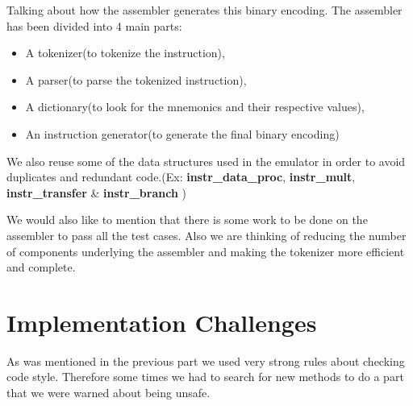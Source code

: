\documentclass[11pt]{article}
\begin{document}
Talking about how the assembler generates this binary encoding. The assembler
has been divided into 4 main parts:
\begin{itemize}
\item A tokenizer(to tokenize the instruction),
\item A parser(to parse the tokenized instruction),
\item A dictionary(to look for the mnemonics and their respective values),
\item An instruction generator(to generate the final binary encoding)
\end{itemize}

We also reuse some of the data structures used in the emulator in order to
avoid duplicates and redundant code.(Ex:
\textbf{instr\_data\_proc}, \textbf{instr\_mult}, \textbf{instr\_transfer} \& \textbf{instr\_branch}
)

We would also like to mention that there is some work to be done on the
assembler to pass all the test cases. Also we are thinking of reducing the
number of components underlying the assembler and making the tokenizer more
efficient and complete.

\section{Implementation Challenges}

As was mentioned in the previous part we used very strong rules about checking
code style. Therefore some times we had to search for new methods to do a part
that we were warned about being unsafe.
\end{document}
